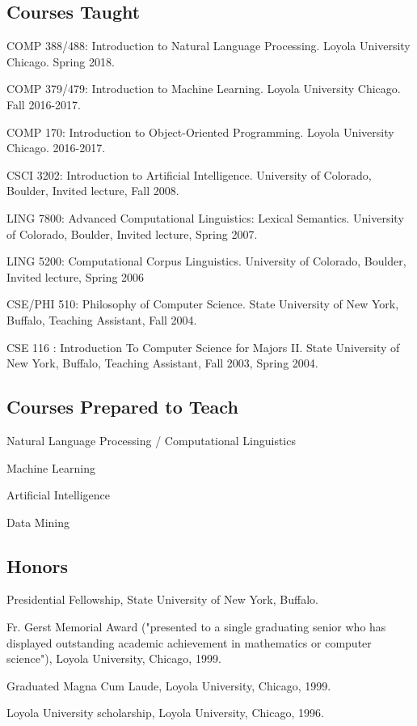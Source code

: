\documentclass[letterpaper]{article}
\renewenvironment{itemize}{
  \begin{list}{}{
    \setlength{\leftmargin}{1.5em}
  }
}{
  \end{list}
}
\begin{document}
\subsection*{Courses Taught}

\begin{itemize}
\item COMP 388/488: Introduction to Natural Language Processing. Loyola University Chicago. Spring 2018.
\item COMP 379/479: Introduction to Machine Learning. Loyola University Chicago. Fall 2016-2017.
\item COMP 170: Introduction to Object-Oriented Programming. Loyola University Chicago. 2016-2017.
\item CSCI 3202: Introduction to Artificial Intelligence. University of Colorado, Boulder, Invited lecture, Fall 2008.
\item LING 7800: Advanced Computational Linguistics: Lexical Semantics. University of Colorado, Boulder, Invited lecture, Spring 2007.
\item LING 5200: Computational Corpus Linguistics. University of Colorado, Boulder, Invited lecture, Spring 2006
\item CSE/PHI 510: Philosophy of Computer Science. State University of New York, Buffalo, Teaching Assistant, Fall 2004.
\item CSE 116 : Introduction To Computer Science for Majors II. State University of New York, Buffalo, Teaching Assistant, Fall 2003, Spring 2004.
\end{itemize}

\subsection*{Courses Prepared to Teach}

\begin{itemize}
\item Natural Language Processing / Computational Linguistics
\item Machine Learning
\item Artificial Intelligence
\item Data Mining
\end{itemize}

\subsection*{Honors}
\begin{itemize}
\item Presidential Fellowship, State University of New York, Buffalo.
\item Fr. Gerst Memorial Award ("presented to a single graduating senior who has displayed outstanding academic achievement in mathematics or computer science"), Loyola University, Chicago, 1999.
\item Graduated Magna Cum Laude, Loyola University, Chicago, 1999.
\item Loyola University scholarship, Loyola University, Chicago, 1996.
\end{itemize}
\end{document}
